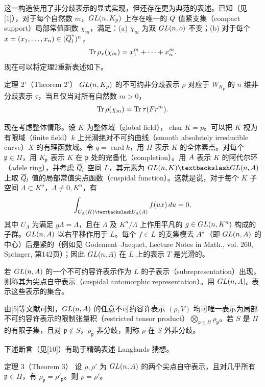 这一构造使用了非分歧表示的显式实现，但还存在更为典范的表述。已知（见[1]），对于每个自然数 $m$，$GL(n,K_{p})$ 上存在唯一的 $Q$ 值紧支集（compact support）局部常值函数 $\chi_m$，满足：(a) $\chi_m$ 为双 $GL(n,o)$ 不变；(b) 对于每个 $x=(x_1,\ldots,x_n)\in(\overline{Q}_l^*)^n$，
\[
 \Tr\rho_x(\chi_m)=x_1^m+\cdots+x_n^m.
\]
现在可以将定理2重新表述如下。

\begin{originaltheorem}{定理 $2'$（Theorem $2'$）}
$GL(n,K_{p})$ 的不可约非分歧表示 $\rho$ 对应于 $W_{K_{\mathfrak p}}$ 的 $n$ 维非分歧表示 $\tau$，当且仅当对所有自然数 $m>0$，
\[
 \Tr\rho(\chi_m)=\Tr\tau(\operatorname{Fr}^m).
\]
\end{originaltheorem}

现在考虑整体情形。设 $K$ 为整体域（global field），$\operatorname{char}K=p$。可以把 $K$ 视为有限域（finite field）$k$ 上光滑绝对不可约曲线（smooth absolutely irreducible curve）$X$ 的有理函数域。令 $q=\operatorname{card}k$，用 $\Pi$ 表示 $K$ 的全体素点。对每个 $\mathfrak p\in\Pi$，用 $K_{\mathfrak p}$ 表示 $K$ 在 $\mathfrak p$ 处的完备化（completion）。用 $A$ 表示 $K$ 的阿代尔环（adele ring），并考虑 $\overline{Q}_l$ 空间 $L$，其元素为
$\GL(n,K)\backslash\GL(n,\A)$ 上取 $\overline{Q}_l$ 值的局部常值尖点函数（cuspidal function）。这就是说，对于每个 $K$ 子空间 $\Lambda\subset K^n$，$\Lambda\ne0,K^n$，有
\[
 \int_{U_\Lambda(K)\backslash U_\Lambda(\A)}f(ux)\,du=0,
\]
其中 $U_\Lambda$ 为满足 $g\Lambda=\Lambda$，且在 $\Lambda$ 及 $K^n/\Lambda$ 上作用平凡的 $g\in GL(n,K^n)$ 构成的子群。$GL(n,A)$ 以右平移作用于 $L$。每个 $f\in L$ 的支集模去 $A^*$（即 $GL(n,A)$ 的中心）后是紧的（例如见 Godement--Jacquet, Lecture Notes in Math., vol. 260, Springer, 第142页）；因此 $GL(n,A)$ 在 $L$ 上的表示 $T$ 是光滑的。

若 $GL(n,A)$ 的一个不可约容许表示作为 $L$ 的子表示（subrepresentation）出现，则称其为尖点自守表示（cuspidal automorphic representation）。用 $GL(n,A)_c$ 表示这些表示的集合。

由[5]等文献可知，$GL(n,A)$ 的任意不可约容许表示 $(\rho,V)$ 均可唯一表示为局部不可约容许表示的限制张量积（restricted tensor product）$\bigotimes_{\mathfrak p\in\Pi}\rho_{\mathfrak p}$。若 $S$ 是 $\Pi$ 的有限子集，且对 $\mathfrak p\notin S$，$\rho_{\mathfrak p}$ 非分歧，则称 $\rho$ 在 $S$ 外非分歧。

下述断言（见[10]）有助于精确表述 Langlands 猜想。
\begin{originaltheorem}{定理 3（Theorem 3）}
设 $\rho,\rho'$ 为 $GL(n,A)$ 的两个尖点自守表示，且对几乎所有 $\mathfrak p\in\Pi$，有 $\rho_{\mathfrak p}=\rho'_{\mathfrak p}$。则 $\rho=\rho'$。
\end{originaltheorem}

